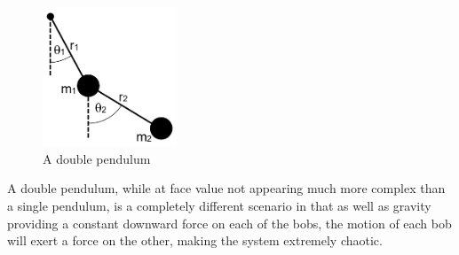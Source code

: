 \documentclass{article}
\begin{document}
\begin{figure}[ht!]
\centering
\includegraphics[width=4cm]{Lagrangian_Double_Pendulum.jpg}
\caption{A double pendulum}
\end{figure}
A double pendulum, while at face value not appearing much more complex than a single pendulum, is a completely different scenario in that as well as gravity providing a constant downward force on each of the bobs, the motion of each bob will exert a force on the other, making the system extremely chaotic. 
\end{document}
